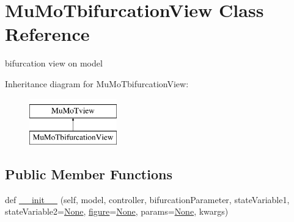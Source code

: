 \hypertarget{class_mu_mo_t_1_1_mu_mo_tbifurcation_view}{}\section{Mu\+Mo\+Tbifurcation\+View Class Reference}
\label{class_mu_mo_t_1_1_mu_mo_tbifurcation_view}


bifurcation view on model  


Inheritance diagram for Mu\+Mo\+Tbifurcation\+View\+:\begin{figure}[H]
\begin{center}
\leavevmode
\includegraphics[height=2.000000cm]{class_mu_mo_t_1_1_mu_mo_tbifurcation_view}
\end{center}
\end{figure}
\subsection*{Public Member Functions}
\begin{DoxyCompactItemize}
\item 
def \hyperlink{class_mu_mo_t_1_1_mu_mo_tbifurcation_view_ac1764fc6547304e629425a5329dc7083}{\+\_\+\+\_\+init\+\_\+\+\_\+} (self, model, controller, bifurcation\+Parameter, state\+Variable1, state\+Variable2=\hyperlink{class_mu_mo_t_1_1_mu_mo_tbifurcation_view_ac7485dcc8d256a6f197ed7802687f252}{None}, \hyperlink{class_mu_mo_t_1_1_mu_mo_tbifurcation_view_a391e34f2de441d79152a7b3d6e4c9c86}{figure}=\hyperlink{class_mu_mo_t_1_1_mu_mo_tbifurcation_view_ac7485dcc8d256a6f197ed7802687f252}{None}, params=\hyperlink{class_mu_mo_t_1_1_mu_mo_tbifurcation_view_ac7485dcc8d256a6f197ed7802687f252}{None}, kwargs)
\end{DoxyCompactItemize}
